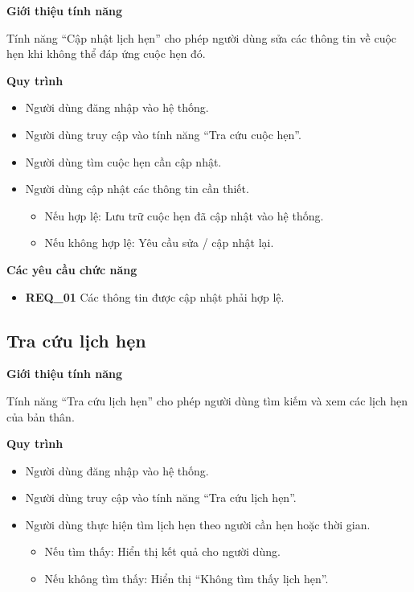 \noindent \textbf{Giới thiệu tính năng}

Tính năng ``Cập nhật lịch hẹn'' cho phép người dùng sửa các thông tin về cuộc hẹn khi không thể đáp ứng cuộc hẹn đó.

\noindent \textbf{Quy trình}
\begin{itemize}
    \item Người dùng đăng nhập vào hệ thống.
    \item Người dùng truy cập vào tính năng ``Tra cứu cuộc hẹn''.
    \item Người dùng tìm cuộc hẹn cần cập nhật.
    \item Người dùng cập nhật các thông tin cần thiết.
    \begin{itemize}
        \item Nếu hợp lệ: Lưu trữ cuộc hẹn đã cập nhật vào hệ thống.
        \item Nếu không hợp lệ: Yêu cầu sửa / cập nhật lại.
    \end{itemize}
\end{itemize}

\noindent \textbf{Các yêu cầu chức năng}
\begin{itemize}
    \item \textbf{REQ\_01} Các thông tin được cập nhật phải hợp lệ.
\end{itemize}

\subsection{Tra cứu lịch hẹn}

\noindent \textbf{Giới thiệu tính năng}

Tính năng ``Tra cứu lịch hẹn'' cho phép người dùng tìm kiếm và xem các lịch hẹn của bản thân.

\noindent \textbf{Quy trình}
\begin{itemize}
    \item Người dùng đăng nhập vào hệ thống.
    \item Người dùng truy cập vào tính năng ``Tra cứu lịch hẹn''.
    \item Người dùng thực hiện tìm lịch hẹn theo người cần hẹn hoặc thời gian.
    \begin{itemize}
        \item Nếu tìm thấy: Hiển thị kết quả cho người dùng.
        \item Nếu không tìm thấy: Hiển thị ``Không tìm thấy lịch hẹn''.
    \end{itemize}
\end{itemize}

